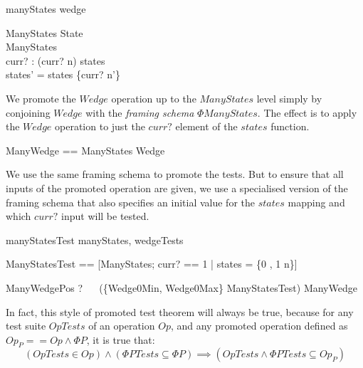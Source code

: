 \documentclass{llncs}
\begin{document}
\begin{zsection}
  \SECTION manyStates \parents wedge
\end{zsection}


\begin{schema}{\Phi ManyStates}
  \Delta State \\
  \Delta ManyStates \\
  curr? : \nat
\where
  (curr? \mapsto n) \in states \\
  states' = states \oplus \{curr? \mapsto n'\}
\end{schema}

We promote the $Wedge$ operation up to the $ManyStates$ level simply by
conjoining $Wedge$ with the \emph{framing schema} $\Phi ManyStates$.
The effect is to apply the $Wedge$ operation to just the $curr?$ element of
the $states$ function. 

\begin{zed}
  ManyWedge == \Phi ManyStates \land Wedge
\end{zed}


We use the same framing schema to promote the tests.  But to ensure that
all inputs of the promoted operation are given, we use a specialised
version of the framing schema that also specifies an initial value
for the $states$ mapping and which $curr?$ input will be tested.

\begin{zsection}
  \SECTION manyStatesTest \parents manyStates, wedgeTests
\end{zsection}

\begin{zed}
  \Phi ManyStatesTest ==
    [\Phi ManyStates; curr? == 1 | states = \{0 , 1 \mapsto n\}]
\end{zed}

\begin{theorem}{ManyWedgePos}
  \vdash? ~~ (\{Wedge0Min, Wedge0Max\} \land \Phi ManyStatesTest)
      \subseteq ManyWedge
\end{theorem}

In fact, this style of promoted test theorem will always be true,
because for any test suite $OpTests$ of an operation $Op$,
and any promoted operation defined as $Op_P == Op \land \Phi P$,
it is true that:
\[
   (OpTests \in Op) \land (\Phi PTests \subseteq \Phi P)
   \implies (OpTests \land \Phi PTests \subseteq Op_P)
\]
\end{document}
